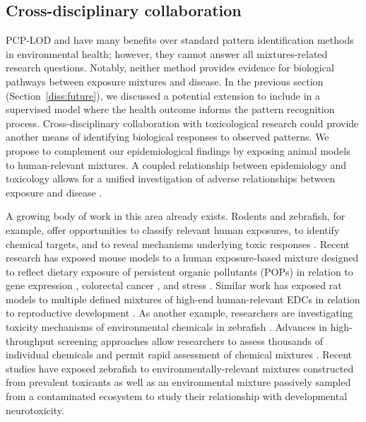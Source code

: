 \subsection{Cross-disciplinary collaboration}
PCP-LOD and \bnmf have many benefits over standard pattern identification methods in environmental health; however, they cannot answer all mixtures-related research questions. Notably, neither method provides evidence for biological pathways between exposure mixtures and disease. In the previous section (Section~\ref{diss:future}), we discussed a potential extension to include \bnmf in a supervised model where the health outcome informs the pattern recognition process. Cross-disciplinary collaboration with toxicological research could provide another means of identifying biological responses to observed patterns. We propose to complement our epidemiological findings by exposing animal models to human-relevant mixtures. A coupled relationship between epidemiology and toxicology allows for a unified investigation of adverse relationships between exposure and disease \citep{adami2011toxicology}.

A growing body of work in this area already exists. Rodents and zebrafish, for example, offer opportunities to classify relevant human exposures, to identify chemical targets, and to reveal mechanisms underlying toxic responses \citep{vaz2019zebrafish}. Recent research has exposed mouse models to a human exposure-based mixture designed to reflect dietary exposure of persistent organic pollutants (POPs) in relation to gene expression \citep{myhre2021maternal}, colorectal cancer \citep{johanson2020maternal}, and stress \citep{hudecova2018human, berntsen2017design}. Similar work has exposed rat models to multiple defined mixtures of high-end human-relevant EDCs in relation to reproductive development \citep{johansson2020calretinin, isling2014late, axelstad2018edc, johansson2016perinatal, ramhoj2018perfluorohexane, christiansen2012mixtures, axelstad2014mixtures}. As another example, researchers are investigating toxicity mechanisms of environmental chemicals in zebrafish \citep{vaz2019zebrafish}. Advances in high-throughput screening approaches allow researchers to assess thousands of individual chemicals and permit rapid assessment of chemical mixtures \citep{tanguay2018rise}. Recent studies have exposed zebrafish to environmentally-relevant mixtures constructed from prevalent toxicants \citep{geier2018systematic} as well as an environmental mixture passively sampled from a contaminated ecosystem \citep{bergmann2017using, allan2012bridging} to study their relationship with developmental neurotoxicity.


